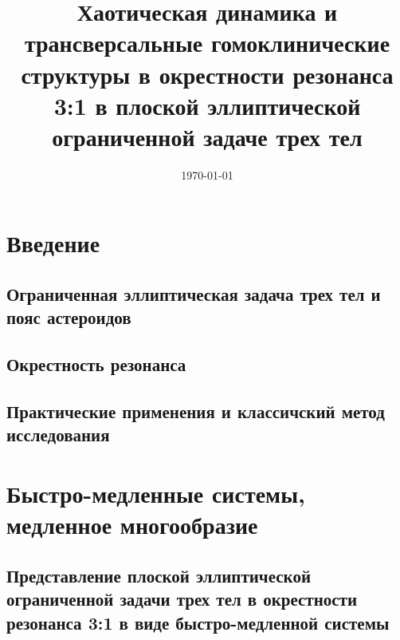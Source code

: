 \documentclass[a4paper, 12pt]{article}
\begin{document}
    \title{Хаотическая динамика и трансверсальные гомоклинические структуры в окрестности резонанса 3:1 в плоской эллиптической ограниченной задаче трех тел}
    \date{\today}
    \maketitle


    \tableofcontents


    \section{Введение}
        \subsection{Ограниченная эллиптическая задача трех тел и пояс астероидов}
        

        \subsection{Окрестность резонанса}
        

        \subsection{Практические применения и классичский метод исследования}
        

    \section{Быстро-медленные системы, медленное многообразие}
        \subsection{Представление плоской эллиптической ограниченной задачи трех тел в окрестности резонанса 3:1 в виде быстро-медленной системы}
        
\end{document}
